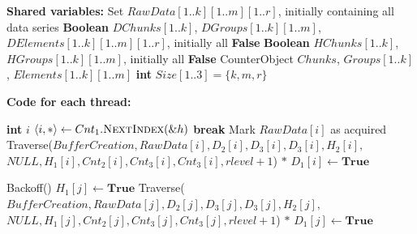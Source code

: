 \documentclass[a4paper,11pt,twoside,openany]{book}
\newcommand{\NextIndex}{\mbox{\sc NextIndex}}
\begin{document}
\begin{algorithm}[t]
    \footnotesize
    \vspace*{2mm}

    \begin{algorithmic}[1]
    
    \State \textbf{Shared variables:}
    \State Set $\mathit{RawData}[1..k][1..m][1..r]$, initially containing all data series \label{alg:bc:r}
    \State \textbf{Boolean} $\mathit{DChunks}[1..k]$, $\mathit{DGroups}[1..k][1..m]$, $\mathit{DElements}[1..k][1..m][1..r]$, initially all \textbf{False} \label{alg:bc:c}
    \State \textbf{Boolean} $\mathit{HChunks}[1..k]$, $\mathit{HGroups}[1..k][1..m]$, initially all \textbf{False} \label{alg:bc:h}
    \State CounterObject $\mathit{Chunks}$, $\mathit{Groups}[1..k]$, $\mathit{Elements}[1..k][1..m]$ \label{alg:bc:e}
    \State \textbf{int} $\mathit{Size}[1..3] = \{k,m,r\}$

    \vspace*{1mm}
    \State \textbf{Code for each thread:}

        \State \textbf{int} $\mathit{i}$
         \label{alg:bc:while:start}
            \State $\langle i, * \rangle \gets Cnt_1.\NextIndex(\&h)$
             \textbf{break} \EndIf
            \State Mark $\mathit{RawData[i]}$ as acquired
                \State Traverse($\mathit{BufferCreation, RawData[i], D_2[i], D_3[i], D_3[i], H_2[i],}$
                \Statex \quad $\mathit{NULL, H_1[i], Cnt_2[i], Cnt_3[i], Cnt_3[i], rlevel+1}$) \label{alg:bc:recur}
            \Else
                \State $*$
            \EndIf
            \State $\mathit{D_1[i]} \gets \textbf{True}$ \label{alg:bc:c:true}
        \EndWhile

         \label{alg:bc:scan:for}
            \State Backoff()  \label{alg:bc:help:backoff}
             \label{alg:bc:help:if}
                \State $\mathit{H_1[j]} \gets \textbf{True}$ \label{alg:bc:h:true}
                    \State Traverse($\mathit{BufferCreation, RawData[j], D_2[j], D_3[j], D_3[j], H_2[j],}$
                    \Statex \quad $\mathit{NULL, H_1[j], Cnt_2[j], Cnt_3[j], Cnt_3[j], rlevel+1}$) \label{alg:bc:help:process}
                \Else
                    \State $*$
                \EndIf
                \State $\mathit{D_1[j]} \gets \textbf{True}$ \label{alg:bc:help:c:true}
            \EndIf
        \EndFor
    \EndProcedure


\end{algorithmic}
\end{algorithm}
\end{document}
